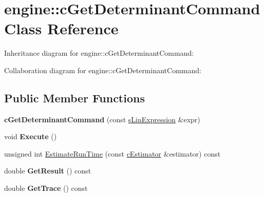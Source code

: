 \hypertarget{classengine_1_1cGetDeterminantCommand}{\section{engine\-:\-:c\-Get\-Determinant\-Command Class Reference}
\label{classengine_1_1cGetDeterminantCommand}
}


Inheritance diagram for engine\-:\-:c\-Get\-Determinant\-Command\-:


Collaboration diagram for engine\-:\-:c\-Get\-Determinant\-Command\-:
\subsection*{Public Member Functions}
\begin{DoxyCompactItemize}
\item 
\hypertarget{classengine_1_1cGetDeterminantCommand_af41928fb91662c6472a520e6c6d98744}{{\bfseries c\-Get\-Determinant\-Command} (const \hyperlink{structengine_1_1sLinExpression}{s\-Lin\-Expression} \&expr)}\label{classengine_1_1cGetDeterminantCommand_af41928fb91662c6472a520e6c6d98744}

\item 
\hypertarget{classengine_1_1cGetDeterminantCommand_aca480db2b0ba85de5fbc51a9b85c8fc1}{void {\bfseries Execute} ()}\label{classengine_1_1cGetDeterminantCommand_aca480db2b0ba85de5fbc51a9b85c8fc1}

\item 
unsigned int \hyperlink{classengine_1_1cGetDeterminantCommand_acd191b8e162f5d2396d1b61973b8fd69}{Estimate\-Run\-Time} (const \hyperlink{classengine_1_1cEstimator}{c\-Estimator} \&estimator) const 
\item 
\hypertarget{classengine_1_1cGetDeterminantCommand_a107211a89657c7e0f898ae7b75c81420}{double {\bfseries Get\-Result} () const }\label{classengine_1_1cGetDeterminantCommand_a107211a89657c7e0f898ae7b75c81420}

\item 
\hypertarget{classengine_1_1cGetDeterminantCommand_a4812eb0ef291440d6d29058c15cbb0f3}{double {\bfseries Get\-Trace} () const }\label{classengine_1_1cGetDeterminantCommand_a4812eb0ef291440d6d29058c15cbb0f3}

\end{DoxyCompactItemize}

